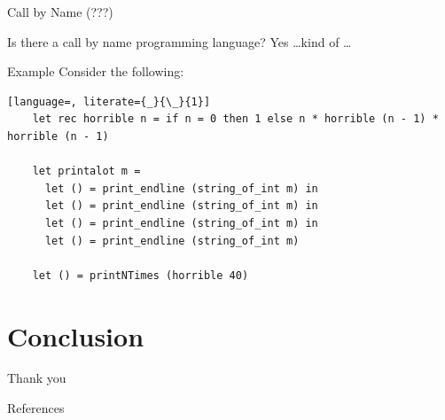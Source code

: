 \documentclass[10pt]{beamer}
\begin{document}
\begin{frame}[fragile]{Call by Name (???)}
  \begin{alertblock}{Is there a call by name programming language?}
    Yes \dots kind of \dots
  \end{alertblock}

  \begin{alertblock}{Example}
    Consider the following:
  \begin{lstlisting}[language=, literate={_}{\_}{1}]
    let rec horrible n = if n = 0 then 1 else n * horrible (n - 1) * horrible (n - 1)

    let printalot m =
      let () = print_endline (string_of_int m) in
      let () = print_endline (string_of_int m) in
      let () = print_endline (string_of_int m) in
      let () = print_endline (string_of_int m)

    let () = printNTimes (horrible 40)

  \end{lstlisting}
  \end{alertblock}
\end{frame}







\section{Conclusion}



\begin{frame}[standout]
  Thank you
\end{frame}

\begin{frame}[allowframebreaks]{References}
  \cite[]{Maraist1995Jan}
  \cite[]{Plotkin1975Dec}
  
  
\end{frame}
\end{document}
